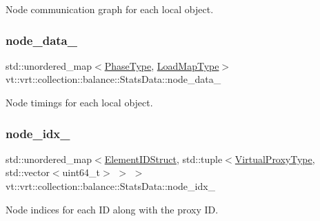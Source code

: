 Node communication graph for each local object. 

\mbox{\label{structvt_1_1vrt_1_1collection_1_1balance_1_1_stats_data_a34a782537ef1b33bfc1c7b1f635e1c72}} 
\subsubsection{\texorpdfstring{node\+\_\+data\+\_\+}{node\_data\_}}
{\footnotesize\ttfamily std\+::unordered\+\_\+map$<$\hyperlink{namespacevt_a46ce6733d5cdbd735d561b7b4029f6d7}{Phase\+Type}, \hyperlink{namespacevt_1_1vrt_1_1collection_1_1balance_a5339303db2e1ce964d783a53fd74e6b1}{Load\+Map\+Type}$>$ vt\+::vrt\+::collection\+::balance\+::\+Stats\+Data\+::node\+\_\+data\+\_\+}



Node timings for each local object. 

\mbox{\label{structvt_1_1vrt_1_1collection_1_1balance_1_1_stats_data_a28e705281f97d1afd659848de7af7d7b}} 
\subsubsection{\texorpdfstring{node\+\_\+idx\+\_\+}{node\_idx\_}}
{\footnotesize\ttfamily std\+::unordered\+\_\+map$<$\hyperlink{structvt_1_1vrt_1_1collection_1_1balance_1_1_element_i_d_struct}{Element\+I\+D\+Struct}, std\+::tuple$<$\hyperlink{namespacevt_a1b417dd5d684f045bb58a0ede70045ac}{Virtual\+Proxy\+Type}, std\+::vector$<$uint64\+\_\+t$>$ $>$ $>$ vt\+::vrt\+::collection\+::balance\+::\+Stats\+Data\+::node\+\_\+idx\+\_\+}



Node indices for each ID along with the proxy ID. 

